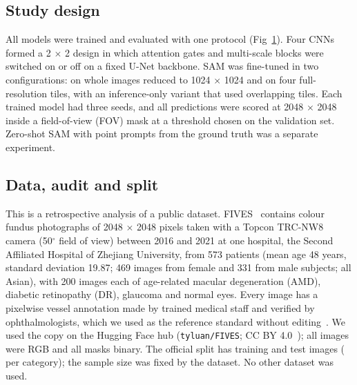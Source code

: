 \subsection*{Study design}
All models were trained and evaluated with one protocol (Fig~\ref{fig:pipeline}). Four CNNs formed a 2 $\times$ 2 design in which attention gates and multi-scale blocks were switched on or off on a fixed
U-Net backbone. SAM was fine-tuned in two configurations: on whole images reduced to 1024 $\times$ 1024 and on four
full-resolution tiles, with an inference-only variant that used overlapping tiles. Each trained model had three seeds,
and all predictions were scored at 2048 $\times$ 2048 inside a field-of-view (FOV) mask at a threshold chosen
on the validation set. Zero-shot SAM with point prompts from the ground truth was a separate experiment.

\begin{figure}[!h]
\caption{\CapPipeline}
\label{fig:pipeline}
\end{figure}

\subsection*{Data, audit and split}
This is a retrospective analysis of a public dataset. FIVES~\cite{jin2022fives} contains colour fundus photographs of
2048 $\times$ 2048 pixels taken with a Topcon TRC-NW8 camera (50$^\circ$ field of view) between 2016 and 2021 at one
hospital, the Second Affiliated Hospital of Zhejiang University, from 573 patients (mean age 48 years, standard
deviation 19.87; 469 images from female and 331 from male subjects; all Asian), with 200 images each of age-related
macular degeneration (AMD), diabetic retinopathy (DR), glaucoma and normal eyes. Every image has a pixelwise vessel
annotation made by trained medical staff and verified by ophthalmologists, which we used as the reference standard without
editing~\cite{jin2022fives}. We used the copy on the Hugging Face hub (\texttt{tyluan/FIVES}; CC BY 4.0~\cite{jin2022fivesdata});
all images were RGB and all masks binary. The
official split has \NTrainOfficial{} training and \NTestOfficial{} test images (\NTestPerCategory{} per category); the
sample size was fixed by the dataset. No other dataset was used.

